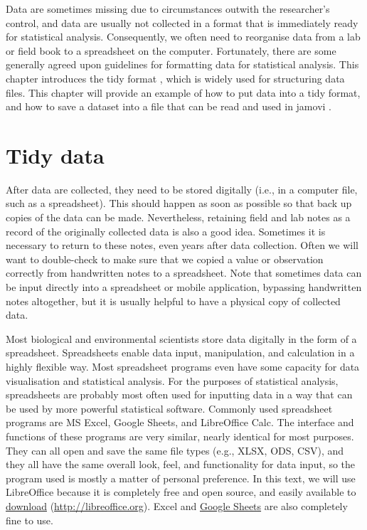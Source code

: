 \documentclass[
  openany]{scrbook}
\begin{document}
Data are sometimes missing due to circumstances outwith the researcher's control, and data are usually not collected in a format that is immediately ready for statistical analysis.
Consequently, we often need to reorganise data from a lab or field book to a spreadsheet on the computer.
Fortunately, there are some generally agreed upon guidelines for formatting data for statistical analysis.
This chapter introduces the tidy format \citep{Wickham2014}, which is widely used for structuring data files.
This chapter will provide an example of how to put data into a tidy format, and how to save a dataset into a file that can be read and used in jamovi \citep{Jamovi2022}.

\hypertarget{tidy-data}{%
\section{Tidy data}\label{tidy-data}}

After data are collected, they need to be stored digitally (i.e., in a computer file, such as a spreadsheet).
This should happen as soon as possible so that back up copies of the data can be made.
Nevertheless, retaining field and lab notes as a record of the originally collected data is also a good idea.
Sometimes it is necessary to return to these notes, even years after data collection.
Often we will want to double-check to make sure that we copied a value or observation correctly from handwritten notes to a spreadsheet.
Note that sometimes data can be input directly into a spreadsheet or mobile application, bypassing handwritten notes altogether, but it is usually helpful to have a physical copy of collected data.

Most biological and environmental scientists store data digitally in the form of a spreadsheet.
Spreadsheets enable data input, manipulation, and calculation in a highly flexible way.
Most spreadsheet programs even have some capacity for data visualisation and statistical analysis.
For the purposes of statistical analysis, spreadsheets are probably most often used for inputting data in a way that can be used by more powerful statistical software.
Commonly used spreadsheet programs are MS Excel, Google Sheets, and LibreOffice Calc.
The interface and functions of these programs are very similar, nearly identical for most purposes.
They can all open and save the same file types (e.g., XLSX, ODS, CSV), and they all have the same overall look, feel, and functionality for data input, so the program used is mostly a matter of personal preference.
In this text, we will use LibreOffice because it is completely free and open source, and easily available to \href{https://www.libreoffice.org/download/download-libreoffice/}{download} (\url{http://libreoffice.org}).
Excel and \href{https://docs.google.com/spreadsheets}{Google Sheets} are also completely fine to use.
\end{document}
